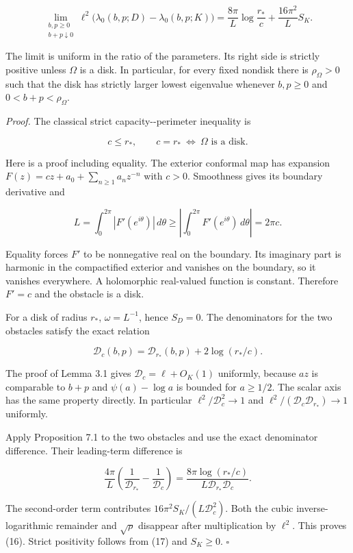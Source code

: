 \documentclass[11pt]{article}
\begin{document}
\[\lim_{\substack{b,p\geq0\\b+p\downarrow0}}
\ell^2\bigl(\lambda_0(b,p;D)-\lambda_0(b,p;K)\bigr)
=\frac{8\pi}{L}\log\frac{r_*}{c}+\frac{16\pi^2}{L}S_K.\tag{16}\]

The limit is uniform in the ratio of the parameters. Its right side is
strictly positive unless \(\Omega\) is a disk. In particular, for every
fixed nondisk there is \(\rho_\Omega>0\) such that the disk has strictly
larger lowest eigenvalue whenever \(b,p\geq0\) and
\(0<b+p<\rho_\Omega\).

\emph{Proof.} The classical strict capacity-\/-perimeter inequality is

\[c\leq r_*,\qquad c=r_*\ \Longleftrightarrow\ \Omega\text{ is a disk}.\tag{17}\]

Here is a proof including equality. The exterior conformal map has
expansion \(F(z)=cz+a_0+\sum_{n\geq1}a_nz^{-n}\) with \(c>0\).
Smoothness gives its boundary derivative and

\[L=\int_0^{2\pi}|F'(e^{i\theta})|\,d\theta\geq\left|\int_0^{2\pi}F'(e^{i\theta})\,d\theta\right|=2\pi c.\]

Equality forces \(F'\) to be nonnegative real on the boundary. Its
imaginary part is harmonic in the compactified exterior and vanishes on
the boundary, so it vanishes everywhere. A holomorphic real-valued
function is constant. Therefore \(F'=c\) and the obstacle is a disk.

For a disk of radius \(r_*\), \(\omega=L^{-1}\), hence \(S_D=0\). The
denominators for the two obstacles satisfy the exact relation

\[\mathcal D_c(b,p)=\mathcal D_{r_*}(b,p)+2\log(r_*/c).\]

The proof of Lemma 3.1 gives \(\mathcal D_c=\ell+O_K(1)\) uniformly,
because \(az\) is comparable to \(b+p\) and \(\psi(a)-\log a\) is
bounded for \(a\geq1/2\). The scalar axis has the same property
directly. In particular \(\ell^2/\mathcal D_c^2\to1\) and
\(\ell^2/(\mathcal D_c\mathcal D_{r_*})\to1\) uniformly.

Apply Proposition 7.1 to the two obstacles and use the exact denominator
difference. Their leading-term difference is

\[\frac{4\pi}{L}\left(\frac1{\mathcal D_{r_*}}-\frac1{\mathcal D_c}\right)
=\frac{8\pi\log(r_*/c)}{L\mathcal D_{r_*}\mathcal D_c}.\]

The second-order term contributes \(16\pi^2S_K/(L\mathcal D_c^2)\). Both
the cubic inverse-logarithmic remainder and \(\sqrt\rho\) disappear
after multiplication by \(\ell^2\). This proves (16). Strict positivity
follows from (17) and \(S_K\geq0\). \(\square\)
\end{document}
